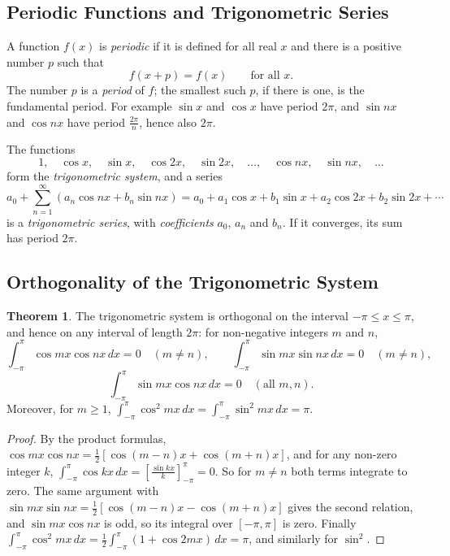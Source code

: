 \documentclass[11pt,a4paper]{article}
\theoremstyle{definition}
\newtheorem{thm}{Theorem}[subsection]
\begin{document}
{\color[wave]{485}\subsection{Periodic Functions and Trigonometric Series}}

A function $f(x)$ is \emph{periodic} if it is defined for all real $x$ and there
is a positive number $p$ such that
\[f(x + p) = f(x)\qquad\text{for all } x .\]
The number $p$ is a \emph{period} of $f$; the smallest such $p$, if there is one,
is the fundamental period. For example $\sin x$ and $\cos x$ have period $2\pi$,
and $\sin nx$ and $\cos nx$ have period $\frac{2\pi}{n}$, hence also $2\pi$.

The functions
\[1,\quad \cos x,\quad \sin x,\quad \cos 2x,\quad \sin 2x,\quad \dots,\quad \cos
nx,\quad \sin nx,\quad \dots\]
form the \emph{trigonometric system}, and a series
\begin{equation}
a_0 + \sum^{\infty}_{n=1}(a_n \cos nx + b_n \sin nx) = a_0 + a_1\cos x + b_1\sin
x + a_2\cos 2x + b_2\sin 2x + \cdots
\label{eq:trigseries}
\end{equation}
is a \emph{trigonometric series}, with \emph{coefficients} $a_0$, $a_n$ and
$b_n$. If it converges, its sum has period $2\pi$.

{\color[wave]{485}\subsection{Orthogonality of the Trigonometric System}}

\begin{thm}
\label{thm:orthogonality}
The trigonometric system is orthogonal on the interval $-\pi \leq x \leq \pi$,
and hence on any interval of length $2\pi$: for non-negative integers $m$ and
$n$,
\[\int^{\pi}_{-\pi} \cos m x \cos n x\,dx = 0\quad ( m\neq n),\qquad
\int^{\pi}_{-\pi}\sin mx \sin nx\,dx = 0 \quad (m\neq n),\]
\[\int^{\pi}_{-\pi}\sin mx \cos nx\,dx = 0\quad (\text{all } m, n) .\]
Moreover, for $m\geq 1$,
$\int^{\pi}_{-\pi} \cos^2 mx\,dx = \int^{\pi}_{-\pi} \sin^2 mx\,dx = \pi$.
\end{thm}

\begin{proof}
By the product formulas,
$\cos mx\cos nx = \frac12[\cos(m - n)x + \cos(m + n)x]$, and for any non-zero
integer $k$, $\int_{-\pi}^\pi\cos kx\,dx = \left[\frac{\sin kx}{k}\right]_{-\pi}^\pi
= 0$. So for $m\neq n$ both terms integrate to zero. The same argument with
$\sin mx\sin nx = \frac12[\cos(m - n)x - \cos(m + n)x]$ gives the second
relation, and $\sin mx\cos nx$ is odd, so its integral over $[-\pi,\pi]$ is
zero. Finally
$\int^{\pi}_{-\pi} \cos^2 mx\,dx = \frac{1}{2}\int^{\pi}_{-\pi}( 1 + \cos
2mx)\,dx = \pi$, and similarly for $\sin^2$.
\end{proof}
\end{document}
